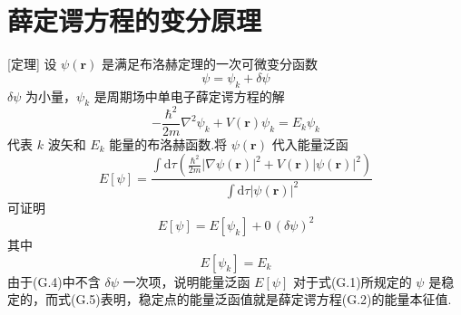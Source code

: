 %
\chapter{薛定谔方程的变分原理}

[定理] 设 $\psi(\boldsymbol{r})$ 是满足布洛赫定理的一次可微变分函数
\begin{equation}
  \psi=\psi_{k}+\delta\psi
\end{equation}
$\delta\psi$ 为小量，$\psi_{k}$ 是周期场中单电子薛定谔方程的解
\begin{equation}
  -\frac{\hbar^{2}}{2m}\nabla^{2}\psi_{k}
  +V(\boldsymbol{r})\psi_{k}=E_{k}\psi_{k}
\end{equation}
代表 $k$ 波矢和 $E_{k}$ 能量的布洛赫函数.将 $\psi(\boldsymbol{r})$ 代入能量泛函
\begin{equation}
  E[\psi]=\frac{\displaystyle\int\mathrm{d}\tau\left(
  \frac{\hbar^{2}}{2m}\left|\nabla\psi(\boldsymbol{r})\right|^{2}
  +V(\boldsymbol{r})\left|\psi(\boldsymbol{r})\right|^{2}\right)}
  {\displaystyle\int\mathrm{d}\tau
  \left|\psi(\boldsymbol{r})\right|^{2}}
\end{equation}
可证明
\begin{equation}
  E[\psi]=E[\psi_{k}]+0\,(\delta\psi)^{2}
\end{equation}
其中
\begin{equation}
  E[\psi_{k}]=E_{k}
\end{equation}
由于(G.4)中不含 $\delta\psi$ 一次项，说明能量泛函 $E[\psi]$ 对于式(G.1)所规定的 $\psi$ 是稳定的，而式(G.5)表明，稳定点的能量泛函值就是薛定谔方程(G.2)的能量本征值.


